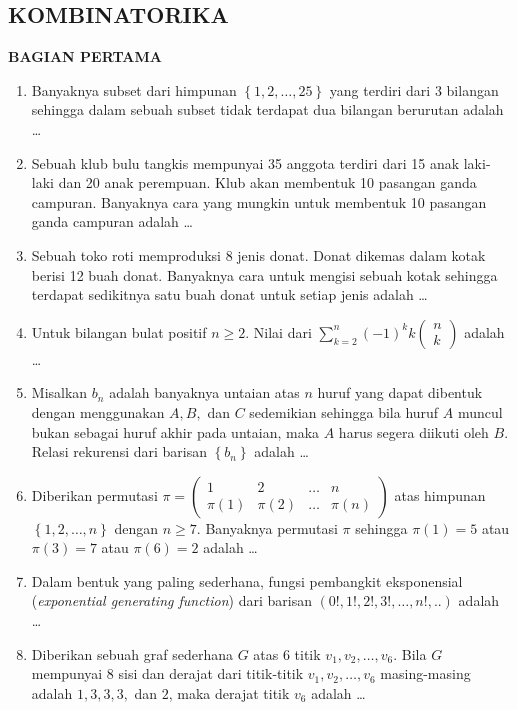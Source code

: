\documentclass[12pt,twoside]{article}
\begin{document}
\subsection{KOMBINATORIKA}
\textbf{BAGIAN PERTAMA}
\begin{enumerate}
	\item Banyaknya subset dari himpunan $\left\lbrace 1, 2,\dots, 25\right\rbrace$ yang terdiri dari 3 bilangan sehingga dalam sebuah subset tidak terdapat dua bilangan berurutan adalah \dots

	\item Sebuah klub bulu tangkis mempunyai 35 anggota terdiri dari 15 anak laki-laki dan 20 anak perempuan. Klub akan membentuk 10 pasangan ganda campuran. Banyaknya cara yang mungkin untuk membentuk 10 pasangan ganda campuran adalah \dots

	\item Sebuah toko roti memproduksi 8 jenis donat. Donat dikemas dalam kotak berisi 12 buah donat. Banyaknya cara untuk mengisi sebuah kotak sehingga terdapat sedikitnya satu buah donat untuk setiap jenis adalah \dots

	\item Untuk bilangan bulat positif $n \geq 2$. Nilai dari $\displaystyle\sum_{k=2}^{n} (-1)^kk\left( \begin{array}{c}
				      n \\k
			      \end{array} \right)$ adalah \dots

	\item Misalkan $b_n$ adalah banyaknya untaian atas $n$ huruf yang dapat dibentuk dengan menggunakan $A,B, $ dan $C$ sedemikian sehingga bila huruf $A$ muncul bukan sebagai huruf akhir pada untaian, maka $A$ harus segera diikuti oleh $B$. Relasi rekurensi dari barisan $\left\lbrace b_n \right\rbrace$ adalah \dots

	\item Diberikan permutasi $\pi = \left( \begin{array}{cccc}
			      1 & 2 & \dots & n \\ \pi(1)&\pi(2)&\dots&\pi(n)
		      \end{array} \right)$ atas himpunan $\left\lbrace 1,2,\dots,n \right\rbrace$ dengan $n \geq 7$. Banyaknya permutasi $\pi$ sehingga $\pi(1) = 5 $ atau $\pi(3) = 7$ atau $\pi(6) = 2$ adalah \dots

	\item Dalam bentuk yang paling sederhana, fungsi pembangkit eksponensial (\textit{exponential generating function}) dari barisan $(0!, 1!, 2!, 3!,\dots,n!,..)$ adalah \dots

	\item Diberikan sebuah graf sederhana $G$ atas 6 titik $v_1,v_2,\dots,v_6$. Bila $G$ mempunyai 8 sisi dan derajat dari titik-titik $v_1,v_2,\dots ,v_6$ masing-masing adalah $1,3,3,3,$ dan $2$, maka derajat titik $v_6$ adalah \dots
\end{enumerate}
\end{document}
